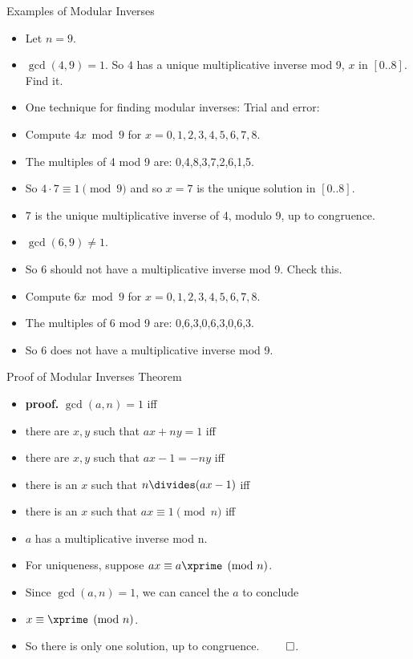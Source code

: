 \documentclass{beamer}
\begin{document}
\begin{frame}{Examples of Modular Inverses}
\begin{itemize}
  \item Let $n=9$.
  \item $\gcd(4,9)=1$. So $4$ has a unique multiplicative inverse mod 9, $x$ in $[0..8]$.  Find it.
  \item One technique for finding modular inverses: Trial and error:
  \item Compute $4x \bmod 9$ for $x=0,1,2,3,4,5,6,7,8$.
  \item The multiples of 4 mod 9 are: 0,4,8,3,7,2,6,1,5.
  \item So $4\cdot 7 \equiv 1 \pmod 9$ and so $x=7$ is the unique solution in $[0..8]$.
  \item 7 is the unique multiplicative inverse of 4, modulo 9, up to congruence.
  \item $\gcd(6,9) \not= 1$.
  \item So 6 should not have a multiplicative inverse mod 9. Check this.
  \item Compute $6x\bmod 9$ for $x=0,1,2,3,4,5,6,7,8$.
  \item The multiples of 6 mod 9 are: 0,6,3,0,6,3,0,6,3.
  \item So 6 does not have a multiplicative inverse mod 9.
\end{itemize}
\end{frame}

\begin{frame}{Proof of Modular Inverses Theorem}
\begin{itemize}
  \item \textbf{proof.} $\gcd(a,n)=1$ iff
  \item there are $x,y$ such that $ax + ny = 1$ iff
  \item there are $x,y$ such that $ax - 1 = -ny$ iff
  \item there is an $x$ such that $n\divides (ax -1)$ iff
  \item there is an $x$ such that $ax \equiv 1 \pmod n$ iff
  \item $a$ has a multiplicative inverse mod n.
  \item For uniqueness, suppose $ax \equiv a\xprime \pmod n$.
  \item Since $\gcd(a, n)=1$, we can cancel the $a$ to conclude
  \item $x\equiv \xprime \pmod n$.
  \item So there is only one solution, up to congruence. $\qed$.
\end{itemize}
\end{frame}
\end{document}
